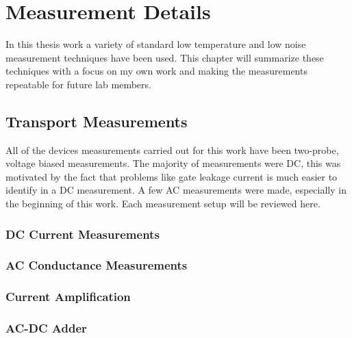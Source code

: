 
\chapter{Measurement Details}
\label{sec:measurement}

In this thesis work a variety of standard low temperature and low noise measurement techniques have been used. This chapter will summarize these techniques with a focus on my own work and making the measurements repeatable for future lab members. 

\section{Transport Measurements}

All of the devices measurements carried out for this work have been two-probe, voltage biased measurements. The majority of measurements were DC, this was motivated by the fact that problems like gate leakage current is much easier to identify in a DC measurement. A few AC measurements were made, especially in the beginning of this work. Each measurement setup will be reviewed here.

\subsection{DC Current Measurements}


\subsection{AC Conductance Measurements}


\subsection{Current Amplification}


\subsection{AC-DC Adder}


